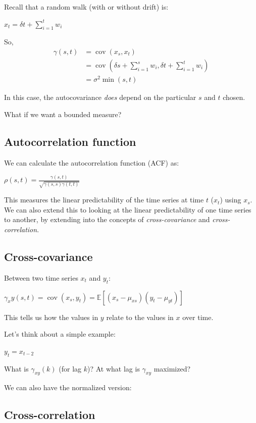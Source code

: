 \documentclass{article}
\begin{document}
Recall that a random walk (with or without drift) is:

$x_t = \delta t + \displaystyle\sum_{i=1}^t w_i$

So,
\begin{equation}
\begin{aligned}
\gamma(s,t) &= \operatorname{cov}(x_s, x_t) \\
&= \operatorname{cov}(\delta s + \displaystyle\sum_{i=1}^s w_i, \delta t + \displaystyle\sum_{i=1}^t w_i)\\
&= \sigma^2 \min(s,t)
\end{aligned}
\end{equation}

In this case, the autocovariance \textit{does} depend on the particular $s$ and $t$ chosen.

What if we want a bounded measure?

\subsection{Autocorrelation function}

We can calculate the autocorrelation function (ACF) as:

$\rho(s,t) = \frac{\gamma(s,t)}{\sqrt{\gamma(s,s)\gamma(t,t)}}$

This measures the linear predictability of the time series at time $t$ ($x_t$) using $x_s$. We can also extend this to looking at the linear predictability of one time series to another, by extending into the concepts of \textit{cross-covariance} and \textit{cross-correlation}.

\subsection{Cross-covariance}

Between two time series $x_t$ and $y_t$:

$\gamma_xy(s,t) = \operatorname{cov}(x_s,y_t) = \mathbb{E}[(x_s -\mu_{xs})(y_t -\mu_{yt})]$

This tells us how the values in $y$ relate to the values in $x$ over time.

Let's think about a simple example:

$y_t = x_{t -2}$

What is $\gamma_{xy}(k)$ (for lag $k$)? At what lag is $\gamma_{xy}$ maximized?

We can also have the normalized version:

\subsection{Cross-correlation}
\end{document}
